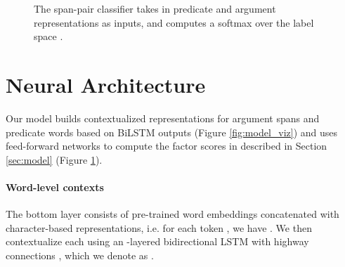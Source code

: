 \documentclass[11pt,a4paper]{article}
\newcommand\layerbox[4]{
\draw[rounded corners] (#2, #3) rectangle (#2 + #1 * #4, #3 + #1 * 1);
}
\newcommand\layercomponent[5]{
\filldraw[fill=#5] (#2 + #1 * #4 - #1 * 0.5, #3 + #1 * 0.5) circle (#1 * 0.4);
}
\newcommand\layer[5][0.4] {
\layerbox{#1}{#2}{#3}{#4}
\foreach \x in {1, ..., #4}{
  \layercomponent{#1}{#2}{#3}{\x}{#5}
}
}
\newcommand\archcomment[3] {
\node[anchor=west, align=left] at (-5.5, #1) {\textbf{#2}};
}
\newcommand\archcommenttwo[4] {
\archcomment{#1}{#2}{#4}
\archcomment{#1-0.4}{#3}{#4}
}
\begin{document}
\newcommand\predin[4] {
\node[anchor=north, align=center] at (#1+0.7, 4.4) {\small #4}; \layer{#1+0.2}{4.5}{2}{g-yellow} \layer{#1+0.4}{5.3}{1}{black} \draw[-latex, line width=1pt] (#1+0.6, 4.9) to (#1+0.6, 5.3); }

\newcommand\nerin[4] {
\node[anchor=north, align=center] at (#1+0.7, 4.4) {\small #4}; \layer{#1}{4.5}{3}{g-green} 
}

\begin{figure}[ht!]
\centering
\scalebox{0.74} {
\hspace{-0.4in}
}
\vspace{-1em}
\caption{The span-pair classifier takes in predicate and argument representations as inputs, and computes a softmax over the label space .
} 
\label{fig:tasks_viz}
\end{figure}
 \section{Neural Architecture}\label{sec:arch}
Our model builds contextualized representations for argument spans  and predicate words  based on BiLSTM outputs (Figure \ref{fig:model_viz}) and uses feed-forward networks to compute the factor scores in  described in Section \ref{sec:model} (Figure \ref{fig:tasks_viz}). 

\paragraph{Word-level contexts}
The bottom layer consists of pre-trained word embeddings concatenated with character-based representations, i.e. for each token , we have
.
We then contextualize each  using an -layered bidirectional LSTM with highway connections \cite{zhang2016highway}, which we denote as .
\end{document}
